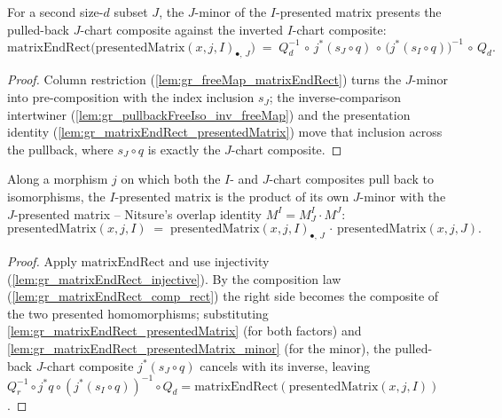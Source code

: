 \begin{lemma}
  \label{lem:gr_matrixEndRect_presentedMatrix_minor}
  For a second size-\(d\) subset \(J\), the \(J\)-minor of the \(I\)-presented matrix presents
  the pulled-back \(J\)-chart composite against the inverted \(I\)-chart composite:
  \[
    \mathrm{matrixEndRect}\bigl(\mathrm{presentedMatrix}(x, j, I)_{\bullet,\, J}\bigr)
      \;=\; Q_d^{-1} \,\circ\, j^{*}(s_J \circ q) \,\circ\,
        \bigl(j^{*}(s_I \circ q)\bigr)^{-1} \,\circ\, Q_d.
  \]
\end{lemma}
\begin{proof}
  Column restriction (\cref{lem:gr_freeMap_matrixEndRect}) turns the \(J\)-minor into
  pre-composition with the index inclusion \(s_J\); the inverse-comparison intertwiner
  (\cref{lem:gr_pullbackFreeIso_inv_freeMap}) and the presentation identity
  (\cref{lem:gr_matrixEndRect_presentedMatrix}) move that inclusion across the pullback, where
  \(s_J \circ q\) is exactly the \(J\)-chart composite.
\end{proof}

\begin{lemma}
  \label{lem:gr_presentedMatrix_changeOfBasis}
  Along a morphism \(j\) on which both the \(I\)- and \(J\)-chart composites pull back to
  isomorphisms, the \(I\)-presented matrix is the product of its own \(J\)-minor with the
  \(J\)-presented matrix -- Nitsure's overlap identity \(M^I = M^I_J \cdot M^J\):
  \[
    \mathrm{presentedMatrix}(x, j, I)
      \;=\; \mathrm{presentedMatrix}(x, j, I)_{\bullet,\, J}
        \,\cdot\, \mathrm{presentedMatrix}(x, j, J).
  \]
\end{lemma}
\begin{proof}
  Apply \(\mathrm{matrixEndRect}\) and use injectivity (\cref{lem:gr_matrixEndRect_injective}).
  By the composition law (\cref{lem:gr_matrixEndRect_comp_rect}) the right side becomes the
  composite of the two presented homomorphisms; substituting
  \cref{lem:gr_matrixEndRect_presentedMatrix} (for both factors) and
  \cref{lem:gr_matrixEndRect_presentedMatrix_minor} (for the minor), the pulled-back
  \(J\)-chart composite \(j^{*}(s_J \circ q)\) cancels with its inverse, leaving
  \(Q_r^{-1} \circ j^{*}q \circ (j^{*}(s_I \circ q))^{-1} \circ Q_d =
  \mathrm{matrixEndRect}(\mathrm{presentedMatrix}(x, j, I))\).
\end{proof}

